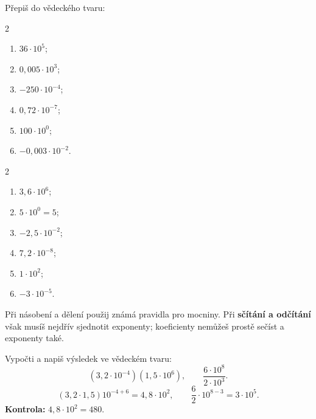 \documentclass[11pt,a4paper]{article}
\begin{document}
\begin{zadaniReseniBox}[breakable=false,title={Samostatná práce 2}]
Přepiš do vědeckého tvaru:
\begin{multicols}{2}
\begin{enumerate}[label=\alph*)]
\item $36\cdot10^5$;
\item $0{,}005\cdot10^3$;
\item $-250\cdot10^{-4}$;
\item $0{,}72\cdot10^{-7}$;
\item $100\cdot10^0$;
\item $-0{,}003\cdot10^{-2}$.
\end{enumerate}
\end{multicols}
\tcblower
\begin{multicols}{2}
\begin{enumerate}[label=\alph*)]
\item $3{,}6\cdot10^6$;
\item $5\cdot10^0=5$;
\item $-2{,}5\cdot10^{-2}$;
\item $7{,}2\cdot10^{-8}$;
\item $1\cdot10^2$;
\item $-3\cdot10^{-5}$.
\end{enumerate}
\end{multicols}
\end{zadaniReseniBox}

Při násobení a dělení použij známá pravidla pro mocniny. Při
\textbf{sčítání a odčítání} však musíš nejdřív sjednotit exponenty;
koeficienty nemůžeš prostě sečíst a exponenty také.
\begin{prikladReseniBox}[breakable=false,title={Příklad 3}]
Vypočti a napiš výsledek ve vědeckém tvaru:
\[
(3{,}2\cdot10^{-4})(1{,}5\cdot10^6),\qquad
\frac{6\cdot10^8}{2\cdot10^3}.
\]
\tcblower
\[
(3{,}2\cdot1{,}5)10^{-4+6}=4{,}8\cdot10^2,\qquad
\frac62\cdot10^{8-3}=3\cdot10^5.
\]
\textbf{Kontrola:} $4{,}8\cdot10^2=480$.
\end{prikladReseniBox}
\end{document}
